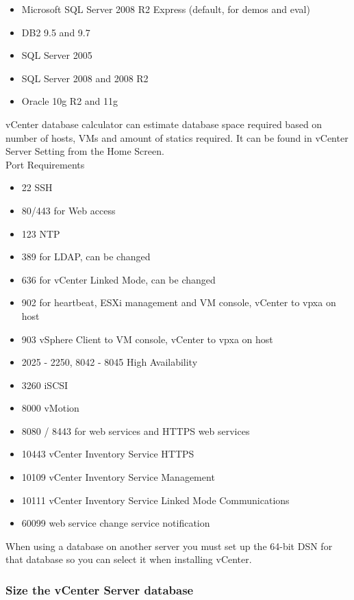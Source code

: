 \begin{itemize}
\item Microsoft SQL Server 2008 R2 Express (default, for demos and eval)
\item DB2 9.5 and 9.7
\item SQL Server 2005
\item SQL Server 2008 and 2008 R2
\item Oracle 10g R2 and 11g
\end{itemize}

vCenter database calculator can estimate database space required based on
number of hosts, VMs and amount of statics required. It can be found in vCenter
Server Setting from the Home Screen.\\

Port Requirements

\begin{itemize}
\item 22 SSH
\item 80/443 for Web access
\item 123 NTP
\item 389 for LDAP, can be changed
\item 636 for vCenter Linked Mode, can be changed
\item 902 for heartbeat, ESXi management and VM console, vCenter to vpxa on host
\item 903 vSphere Client to VM console, vCenter to vpxa on host
\item 2025 - 2250, 8042 - 8045 High Availability
\item 3260 iSCSI
\item 8000 vMotion
\item 8080 / 8443 for web services and HTTPS web services
\item 10443 vCenter Inventory Service HTTPS
\item 10109 vCenter Inventory Service Management
\item 10111 vCenter Inventory Service Linked Mode Communications
\item 60099 web service change service notification
\end{itemize}

When using a database on another server you must set up the 64-bit DSN for that database so you
can select it when installing vCenter.

\subsubsection{Size the vCenter Server database}

